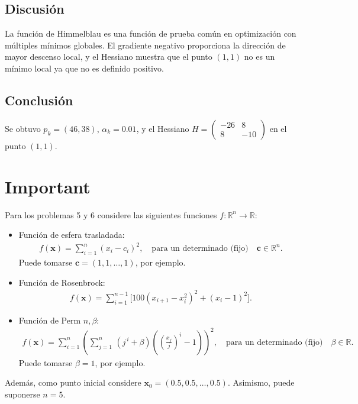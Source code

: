 \documentclass{article}
\begin{document}
\subsection{Discusión}

La función de Himmelblau es una función de prueba común en optimización con múltiples mínimos globales. El gradiente negativo proporciona la dirección de mayor descenso local, y el Hessiano muestra que el punto $(1,1)$ no es un mínimo local ya que no es definido positivo.

\subsection{Conclusión}

Se obtuvo $p_k = (46, 38)$, $\alpha_k = 0.01$, y el Hessiano $H = \begin{pmatrix} -26 & 8 \\ 8 & -10 \end{pmatrix}$ en el punto $(1,1)$.

\section*{Important}

Para los problemas 5 y 6 considere las siguientes funciones $f : \mathbb{R}^n \rightarrow \mathbb{R}$:

\begin{itemize}
    \item Función de esfera trasladada:\\
    \begin{align} \tag{4}
        f(\mathbf{x}) = \sum_{i=1}^{n} (x_i - c_i)^2, \quad \text{para un determinado (fijo)} \quad \mathbf{c} \in \mathbb{R}^n.
    \end{align}
    Puede tomarse $\mathbf{c} = (1,1,\dots,1)$, por ejemplo.

    \item Función de Rosenbrock:\\
    \begin{align}  \tag{5}
        f(\mathbf{x}) = \sum_{i=1}^{n-1} \Big[ 100(x_{i+1} - x_i^{2})^{2} + (x_i - 1)^{2} \Big].
    \end{align}

    \item Función de Perm $n,\beta$:\\
    \begin{align}  \tag{6}
        f(\mathbf{x}) =
        \sum_{i=1}^{n} \left(
            \sum_{j=1}^{n}\,(j^{\,i} + \beta)\left( \left(\frac{x_j}{j}\right)^{i} - 1 \right)
        \right)^{2}, \quad \text{para un determinado (fijo)} \quad \beta \in \mathbb{R}.
    \end{align}
    Puede tomarse $\beta = 1$, por ejemplo.
\end{itemize}
Además, como punto inicial considere $\mathbf{x}_0 = (0.5,0.5,\dots,0.5)$. Asimismo, puede suponerse $n=5$.
\end{document}
